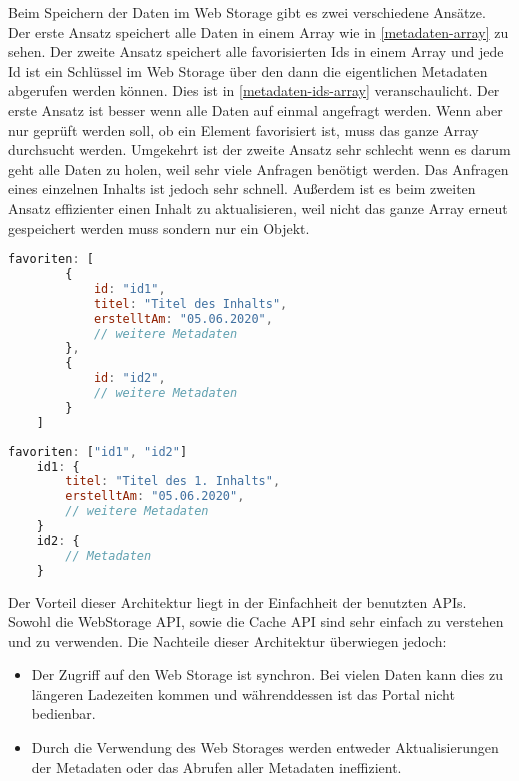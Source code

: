 
Beim Speichern der Daten im Web Storage gibt es zwei verschiedene Ansätze. Der erste Ansatz speichert alle Daten in einem Array wie in \autoref{metadaten-array} zu sehen. Der zweite Ansatz speichert alle favorisierten Ids in einem Array und jede Id ist ein Schlüssel im Web Storage über den dann die eigentlichen Metadaten abgerufen werden können. Dies ist in \autoref{metadaten-ids-array} veranschaulicht.
Der erste Ansatz ist besser wenn alle Daten auf einmal angefragt werden. Wenn aber nur geprüft werden soll, ob ein Element favorisiert ist, muss das ganze Array durchsucht werden. Umgekehrt ist der zweite Ansatz sehr schlecht wenn es darum geht alle Daten zu holen, weil sehr viele Anfragen benötigt werden. Das Anfragen eines einzelnen Inhalts ist jedoch sehr schnell. Außerdem ist es beim zweiten Ansatz effizienter einen Inhalt zu aktualisieren, weil nicht das ganze Array erneut gespeichert werden muss sondern nur ein Objekt.

\clearpage

\begin{lstlisting}[language=JavaScript,caption={Speichern der Metadaten in einem Array},label={metadaten-array}]
    favoriten: [
    	{
    		id: "id1",
    		titel: "Titel des Inhalts",
    		erstelltAm: "05.06.2020",
    		// weitere Metadaten
    	},
    	{
    		id: "id2",
    		// weitere Metadaten
    	}
    ]
\end{lstlisting}

\begin{lstlisting}[language=JavaScript,caption={Speichern der Ids in einem Array},label={metadaten-ids-array}]
    favoriten: ["id1", "id2"]
    id1: {
    	titel: "Titel des 1. Inhalts",
    	erstelltAm: "05.06.2020",
    	// weitere Metadaten
    }
    id2: { 
    	// Metadaten
    }
\end{lstlisting}

Der Vorteil dieser Architektur liegt in der Einfachheit der benutzten \acp{API}. Sowohl die WebStorage \ac{API}, sowie die Cache \ac{API} sind sehr einfach zu verstehen und zu verwenden. Die Nachteile dieser Architektur überwiegen jedoch:

\begin{itemize}
\item Der Zugriff auf den Web Storage ist synchron. Bei vielen Daten kann dies zu längeren Ladezeiten kommen und währenddessen ist das Portal nicht bedienbar. 
\item Durch die Verwendung des Web Storages werden entweder Aktualisierungen der Metadaten oder das Abrufen aller Metadaten ineffizient. 
\end{itemize}

